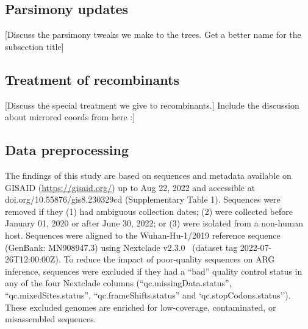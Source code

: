 \documentclass{article}
\begin{document}
\subsection{Parsimony updates}
[Discuss the parsimony tweaks we make to the trees. Get a better name
for the subsection title]

\subsection{Treatment of recombinants}
[Discuss the special treatment we give to recombinants.]
Include the discussion about mirrored coords from here :]




\subsection{Data preprocessing}

The findings of this study are
based on sequences and metadata available on GISAID (\url{https://gisaid.org/})
up to Aug 22, 2022 and accessible at
doi.org/10.55876/gis8.230329cd (Supplementary Table 1). Sequences were removed
if they (1) had ambiguous collection dates; (2) were collected before January
01, 2020 or after June 30, 2022; or (3) were isolated from a non-human host.
Sequences were aligned to the Wuhan-Hu-1/2019 reference sequence (GenBank:
MN908947.3) using Nextclade v2.3.0~\citep{Aksamentov2021-hj} (dataset tag
2022-07-26T12:00:00Z). To reduce the impact of poor-quality sequences on ARG
inference, sequences were excluded if they had a ``bad'' quality control status
in any of the four Nextclade columns (``qc.missingData.status'',
``qc.mixedSites.status'', ``qc.frameShifts.status'' and
`qc.stopCodons.status''). These excluded genomes are enriched for low-coverage,
contaminated, or misassembled sequences.
\end{document}
